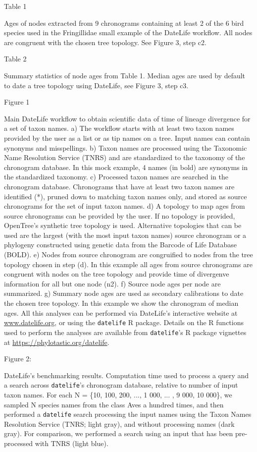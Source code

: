 Table 1

Ages of nodes extracted from 9 chronograms containing at least 2 of the 6 bird species used in the Fringillidae small example of the DateLife workflow. All nodes are congruent with the chosen tree topology. See Figure 3, step c2.

Table 2

Summary statistics of node ages from Table 1. Median ages are used by default to date a tree topology using DateLife, see Figure 3, step c3.

Figure 1

Main DateLife workflow to obtain scientific data of time of lineage divergence for a set of taxon names. a) The workflow starts with at least two taxon names provided by the user as a list or as tip names on a tree. Input names can contain synonyms and misspellings.
b) Taxon names are processed using the Taxonomic Name Resolution Service (TNRS) and are standardized to the taxonomy of the chronogram database. In this mock example, 4 names (in bold) are synonyms in the standardized taxonomy.
c) Processed taxon names are searched in the chronogram database. Chronograms that have at least two taxon names are identified (*), pruned down to matching taxon names only, and stored as source chronograms for the set of input taxon names.
d) A topology to map ages from source chronograms can be provided by the user. If no topology is provided, OpenTree's synthetic tree topology is used. Alternative topologies that can be used are the largest (with the most input taxon names) source chronogram or a phylogeny constructed using genetic data from the Barcode of Life Database (BOLD).
e) Nodes from source chronogram are congruified to nodes from the tree topology chosen in step (d). In this example all ages from source chronograms are congruent with nodes on the tree topology and provide time of divergenve information for all but one node (n2).
f) Source node ages per node are summarized.
g) Summary node ages are used as secondary calibrations to date the chosen tree topology. In this example we show the chronogram of median ages.
All this analyses can be performed via DateLife's interactive website at \url{www.datelife.org}, or using the \texttt{datelife} R package. Details on the R functions used to perform the analyses are available from \texttt{datelife}'s R package vignettes at \url{https://phylotastic.org/datelife}.

Figure 2:

DateLife's benchmarking results. Computation time used to process a query and a search across \texttt{datelife}'s chronogram database, relative to number of input taxon names. For each N = \{10, 100, 200, ..., 1 000, ... , 9 000, 10 000\}, we sampled N species names from the class Aves a hundred times, and then performed a \texttt{datelife} search processing the input names using the Taxon Names Resolution Service (TNRS; light gray), and without processing names (dark gray). For comparison, we performed a search using an input that has been pre-processed with TNRS (light blue).

